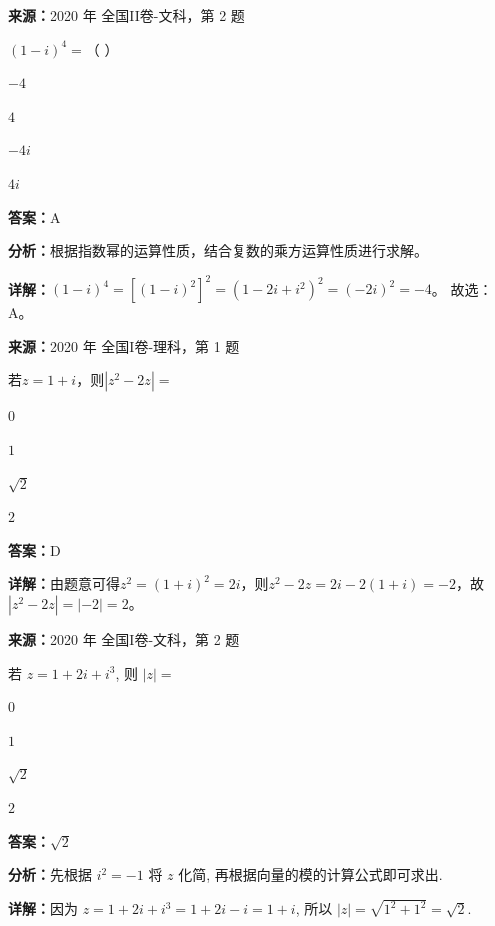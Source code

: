 \begin{question}[points=5]
\textbf{来源：}2020 年 全国II卷-文科，第 2 题\par
$(1-i)^4 =$（ ）
\begin{choices}
  \item $-4$
  \item $4$
  \item $-4i$
  \item $4i$
\end{choices}
\begin{solution}
\textbf{答案：}A

\textbf{分析：}根据指数幂的运算性质，结合复数的乘方运算性质进行求解。

\textbf{详解：}$(1-i)^4 = [(1-i)^2]^2 = (1-2i+i^2)^2 = (-2i)^2 = -4$。
故选：A。
\end{solution}
\end{question}

\begin{question}[points=5]
\textbf{来源：}2020 年 全国I卷-理科，第 1 题\par
若$z=1+i$，则$|z^2-2z|=$
\begin{choices}
  \item $0$
  \item $1$
  \item $\sqrt{2}$
  \item $2$
\end{choices}
\begin{solution}
\textbf{答案：}D

\textbf{详解：}由题意可得$z^2=(1+i)^2=2i$，则$z^2-2z=2i-2(1+i)=-2$，故$|z^2-2z|=|-2|=2$。
\end{solution}
\end{question}

\begin{question}[points=5]
\textbf{来源：}2020 年 全国I卷-文科，第 2 题\par
若 $z = 1 + 2i + i^3$, 则 $|z| =$
\begin{choices}
  \item $0$
  \item $1$
  \item $\sqrt{2}$
  \item $2$
\end{choices}
\begin{solution}
\textbf{答案：}$\sqrt{2}$

\textbf{分析：}先根据 $i^2 = -1$ 将 $z$ 化简, 再根据向量的模的计算公式即可求出.

\textbf{详解：}因为 $z = 1 + 2i + i^3 = 1 + 2i - i = 1 + i$, 所以 $|z| = \sqrt{1^2 + 1^2} = \sqrt{2}$.
\end{solution}
\end{question}

